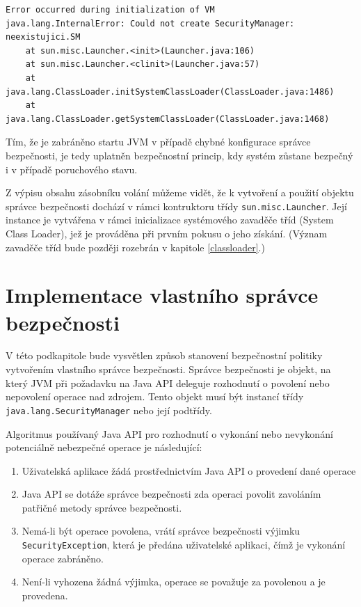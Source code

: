 \begin{lstlisting}[caption=Vyjímka při spuštění JVM s neexistujícím správcem bezpečnosti, label=smEx]
Error occurred during initialization of VM
java.lang.InternalError: Could not create SecurityManager: neexistujici.SM
    at sun.misc.Launcher.<init>(Launcher.java:106)
    at sun.misc.Launcher.<clinit>(Launcher.java:57)
    at java.lang.ClassLoader.initSystemClassLoader(ClassLoader.java:1486)
    at java.lang.ClassLoader.getSystemClassLoader(ClassLoader.java:1468)
\end{lstlisting}

Tím, že je zabráněno startu JVM v případě chybné konfigurace správce bezpečnosti, je tedy uplatněn bezpečnostní princip, kdy systém zůstane bezpečný i v případě poruchového stavu.

Z výpisu obsahu zásobníku volání můžeme vidět, že k vytvoření a použití objektu správce bezpečnosti dochází v rámci kontruktoru třídy {\tt sun.misc.Launcher}. Její instance je vytvářena v rámci inicializace systémového zavaděče tříd (System Class Loader), jež je prováděna při prvním pokusu o jeho získání. (Význam zavaděče tříd bude později rozebrán v kapitole \ref{classloader}.)

\section{Implementace vlastního správce bezpečnosti} \label{vlastniSM}

V této podkapitole bude vysvětlen způsob stanovení bezpečnostní politiky vytvořením vlastního správce bezpečnosti.
Správce bezpečnosti je objekt, na který JVM při požadavku na Java API deleguje rozhodnutí o povolení nebo nepovolení operace nad zdrojem.
Tento objekt musí být instancí třídy {\tt java.lang.SecurityManager} nebo její podtřídy. \cite{tutorialsTSM}

Algoritmus používaný Java API pro rozhodnutí o vykonání nebo nevykonání potenciálně nebezpečné operace je následující: \cite[4.1.1]{oaks}

\begin{enumerate}
  \item Uživatelská aplikace žádá prostřednictvím Java API o provedení dané operace
  \item Java API se dotáže správce bezpečnosti zda operaci povolit zavoláním patřičné metody správce bezpečnosti.
  \item Nemá-li být operace povolena, vrátí správce bezpečnosti výjimku {\tt SecurityException}, která je předána uživatelské aplikaci, čímž je vykonání operace zabráněno.
  \item Není-li vyhozena žádná výjimka, operace se považuje za povolenou a je provedena.
\end{enumerate}


